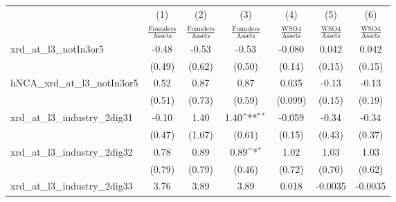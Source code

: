 {
\def\sym#1{\ifmmode^{#1}\else\(^{#1}\)\fi}
\begin{tabular}{l*{6}{c}}
\toprule
                    &\multicolumn{1}{c}{(1)}&\multicolumn{1}{c}{(2)}&\multicolumn{1}{c}{(3)}&\multicolumn{1}{c}{(4)}&\multicolumn{1}{c}{(5)}&\multicolumn{1}{c}{(6)}\\
                    &\multicolumn{1}{c}{$\frac{\textrm{Founders}}{\textrm{Assets}}$}&\multicolumn{1}{c}{$\frac{\textrm{Founders}}{\textrm{Assets}}$}&\multicolumn{1}{c}{$\frac{\textrm{Founders}}{\textrm{Assets}}$}&\multicolumn{1}{c}{$\frac{\textrm{WSO4}}{\textrm{Assets}}$}&\multicolumn{1}{c}{$\frac{\textrm{WSO4}}{\textrm{Assets}}$}&\multicolumn{1}{c}{$\frac{\textrm{WSO4}}{\textrm{Assets}}$}\\
\midrule
xrd\_at\_l3\_notIn3or5 &       -0.48         &       -0.53         &       -0.53         &      -0.080         &       0.042         &       0.042         \\
                    &      (0.49)         &      (0.62)         &      (0.50)         &      (0.14)         &      (0.15)         &      (0.15)         \\
\addlinespace
hNCA\_xrd\_at\_l3\_notIn3or5&        0.52         &        0.87         &        0.87         &       0.035         &       -0.13         &       -0.13         \\
                    &      (0.51)         &      (0.73)         &      (0.59)         &     (0.099)         &      (0.15)         &      (0.19)         \\
\addlinespace
xrd\_at\_l3\_industry\_2dig31&       -0.10         &        1.40         &        1.40\sym{**} &      -0.059         &       -0.34         &       -0.34         \\
                    &      (0.47)         &      (1.07)         &      (0.61)         &      (0.15)         &      (0.43)         &      (0.37)         \\
\addlinespace
xrd\_at\_l3\_industry\_2dig32&        0.78         &        0.89         &        0.89\sym{*}  &        1.02         &        1.03         &        1.03         \\
                    &      (0.79)         &      (0.79)         &      (0.46)         &      (0.72)         &      (0.70)         &      (0.62)         \\
\addlinespace
xrd\_at\_l3\_industry\_2dig33&        3.76         &        3.89         &        3.89         &       0.018         &     -0.0035         &     -0.0035         \\

\end{tabular}}
